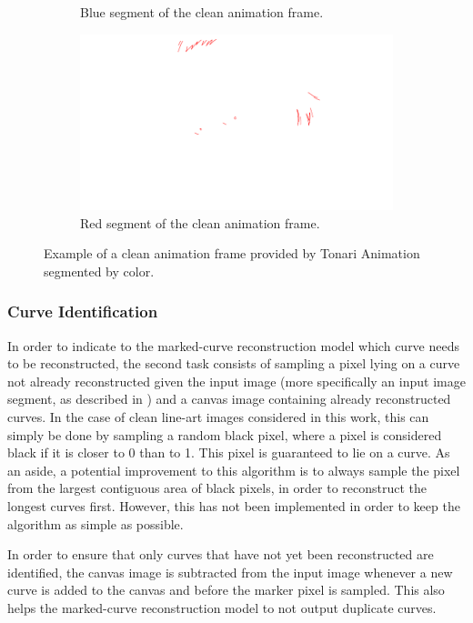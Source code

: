 \begin{figure}
\begin{subfigure}{.5\textwidth}
    \caption{Blue segment of the clean animation frame.}
\end{subfigure}%
\begin{subfigure}{.5\textwidth}
    \includegraphics[width=\textwidth]{graphics/douga/49_red.pdf}
    \caption{Red segment of the clean animation frame.}
\end{subfigure}%
    \caption{Example of a clean animation frame provided by Tonari Animation segmented by color.}
    \label{fig:segment.ex}
\end{figure}

\subsubsection{Curve Identification}
\label{subsubsec:curve.ident}

In order to indicate to the marked-curve reconstruction model which curve needs to be reconstructed, the second task consists of sampling a pixel lying on a curve not already reconstructed given the input image (more specifically an input image segment, as described in ) and a canvas image containing already reconstructed curves. In the case of clean line-art images considered in this work, this can simply be done by sampling a random black pixel, where a pixel is considered black if it is closer to 0 than to 1. This pixel is guaranteed to lie on a curve. As an aside, a potential improvement to this algorithm is to always sample the pixel from the largest contiguous area of black pixels, in order to reconstruct the longest curves first. However, this has not been implemented in order to keep the algorithm as simple as possible.

In order to ensure that only curves that have not yet been reconstructed are identified, the canvas image is subtracted from the input image whenever a new curve is added to the canvas and before the marker pixel is sampled. This also helps the marked-curve reconstruction model to not output duplicate curves.

